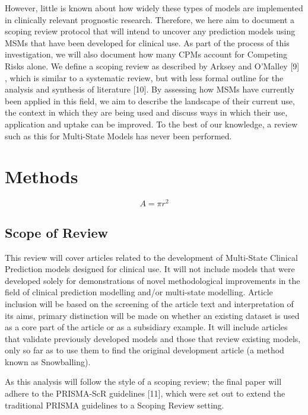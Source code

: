 \documentclass[12pt,twoside]{reedthesis}
\begin{document}
However, little is known about how widely these types of models are implemented in clinically relevant prognostic research. Therefore, we here aim to document a scoping review protocol that will intend to uncover any prediction models using MSMs that have been developed for clinical use. As part of the process of this investigation, we will also document how many CPMs account for Competing Risks alone. We define a scoping review as described by Arksey and O'Malley {[}9{]} , which is similar to a systematic review, but with less formal outline for the analysis and synthesis of literature {[}10{]}. By assessing how MSMs have currently been applied in this field, we aim to describe the landscape of their current use, the context in which they are being used and discuss ways in which their use, application and uptake can be improved. To the best of our knowledge, a review such as this for Multi-State Models has never been performed.

\hypertarget{methods}{%
\section{Methods}\label{methods}}

\[ 
A= \pi r^2
\]

\hypertarget{scope-of-review}{%
\subsection{Scope of Review}\label{scope-of-review}}

This review will cover articles related to the development of Multi-State Clinical Prediction models designed for clinical use. It will not include models that were developed solely for demonstrations of novel methodological improvements in the field of clinical prediction modelling and/or multi-state modelling. Article inclusion will be based on the screening of the article text and interpretation of its aims, primary distinction will be made on whether an existing dataset is used as a core part of the article or as a subsidiary example. It will include articles that validate previously developed models and those that review existing models, only so far as to use them to find the original development article (a method known as Snowballing).

As this analysis will follow the style of a scoping review; the final paper will adhere to the PRISMA-ScR guidelines {[}11{]}, which were set out to extend the traditional PRISMA guidelines to a Scoping Review setting.
\end{document}
